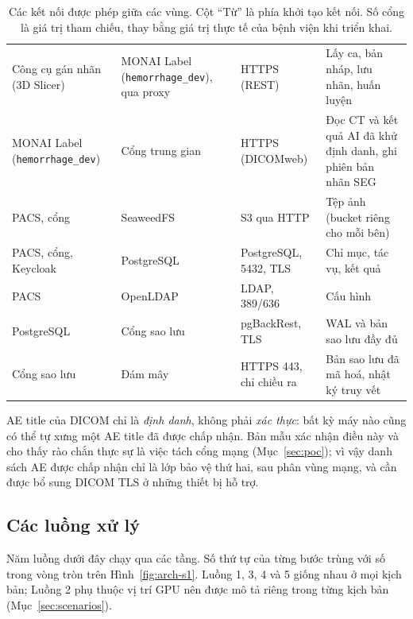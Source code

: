 \begin{table}[H]
\begin{tabularx}{\textwidth}{@{}p{2.6cm} p{2.6cm} p{3.0cm} Y@{}}
Công cụ gán nhãn (3D Slicer) & MONAI Label (\texttt{hemorrhage\_dev}), qua proxy & HTTPS (REST) & Lấy ca, bản nháp, lưu nhãn, huấn luyện \\
MONAI Label (\texttt{hemorrhage\_dev}) & Cổng trung gian & HTTPS (DICOMweb) & Đọc CT và kết quả AI đã khử định danh, ghi phiên bản nhãn SEG \\
PACS, cổng & SeaweedFS & S3 qua HTTP & Tệp ảnh (bucket riêng cho mỗi bên) \\
PACS, cổng, Keycloak & PostgreSQL & PostgreSQL, 5432, TLS & Chỉ mục, tác vụ, kết quả \\
PACS & OpenLDAP & LDAP, 389/636 & Cấu hình \\
PostgreSQL & Cổng sao lưu & pgBackRest, TLS & WAL và bản sao lưu đầy đủ \\
Cổng sao lưu & Đám mây & HTTPS 443, chỉ chiều ra & Bản sao lưu đã mã hoá, nhật ký truy vết \\
\bottomrule
\end{tabularx}
\caption{Các kết nối được phép giữa các vùng. Cột ``Từ'' là phía khởi tạo kết nối. Số
cổng là giá trị tham chiếu, thay bằng giá trị thực tế của bệnh viện khi triển khai.}
\label{tab:interfaces}
\end{table}

AE title của DICOM chỉ là \emph{định danh}, không phải \emph{xác thực}: bất kỳ máy nào
cũng có thể tự xưng một AE title đã được chấp nhận. Bản mẫu xác nhận điều này và cho
thấy rào chắn thực sự là việc tách cổng mạng (Mục~\ref{sec:poc}); vì vậy danh sách AE
được chấp nhận chỉ là lớp bảo vệ thứ hai, sau phân vùng mạng, và cần được bổ sung DICOM
TLS ở những thiết bị hỗ trợ.

\subsection{Các luồng xử lý}
\label{sec:flow}

Năm luồng dưới đây chạy qua các tầng. Số thứ tự của từng bước trùng với số trong vòng
tròn trên Hình~\ref{fig:arch-s1}. Luồng 1, 3, 4 và 5 giống nhau ở mọi kịch bản; Luồng
2 phụ thuộc vị trí GPU nên được mô tả riêng trong từng kịch bản
(Mục~\ref{sec:scenarios}).


